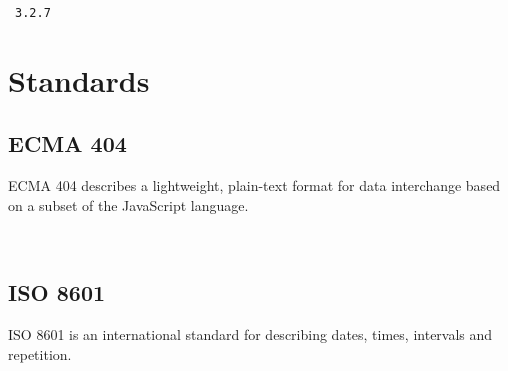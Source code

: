 \documentclass[10pt]{article}
\begin{document}
\example\ {\tt 3.2.7}




%
%

\section{Standards}\label{standards}

\subsection{ECMA 404}
ECMA 404 describes a lightweight, plain-text format for data
interchange based on a subset of the JavaScript language.

\\


\subsection{ISO 8601}
ISO 8601 is an international standard for describing dates, times,
intervals and repetition.

\\
\end{document}
